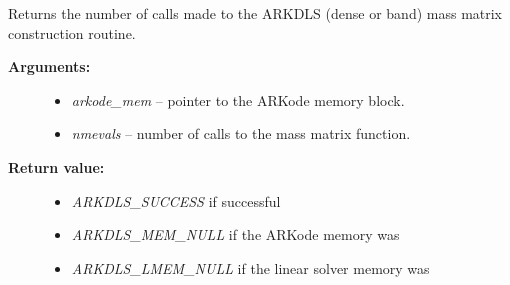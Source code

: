 \documentclass[letterpaper,10pt,english]{sphinxmanual}
\begin{document}
\begin{fulllineitems}
\label{c_interface/User_callable:c.ARKDlsGetNumMassEvals}
Returns the number of calls made to the ARKDLS
(dense or band) mass matrix construction routine.
\begin{description}
\item[{\textbf{Arguments:}}] \leavevmode\begin{itemize}
\item {} 
\emph{arkode\_mem} -- pointer to the ARKode memory block.

\item {} 
\emph{nmevals} -- number of calls to the mass matrix function.

\end{itemize}

\item[{\textbf{Return value:}}] \leavevmode\begin{itemize}
\item {} 
\emph{ARKDLS\_SUCCESS} if successful

\item {} 
\emph{ARKDLS\_MEM\_NULL} if the ARKode memory was 

\item {} 
\emph{ARKDLS\_LMEM\_NULL} if the linear solver memory was 

\end{itemize}

\end{description}

\end{fulllineitems}

\end{document}
